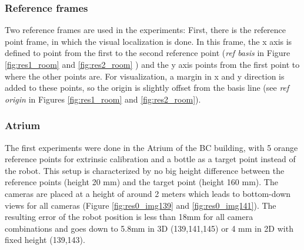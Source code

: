\subsubsection{Reference frames}
Two reference frames are used in the experiments: First, there is the reference point frame, in which the visual localization is done. 
In this frame, the x axis is defined to point from the first to the second reference point (\textit{ref basis} in Figure \ref{fig:res1_room} and \ref{fig:res2_room} ) and the y axis points from the first point to where the other points are.
For visualization, a margin in x and y direction is added to these points, so the origin is slightly offset from the basis line (see \textit{ref origin} in Figures \ref{fig:res1_room} and \ref{fig:res2_room}).

\subsubsection{Atrium}
The first experiments were done in the Atrium of the BC building, with 5 orange reference points for extrinsic calibration and a bottle as a target point instead of the robot.
This setup is characterized by no big height difference between the reference points (height 20 mm) and the target point (height 160 mm). 
The cameras are placed at a height of around 2 meters which leads to bottom-down views for all cameras (Figure \ref{fig:res0_img139} and \ref{fig:res0_img141}).
The resulting error of the robot position is less than 18mm for all camera combinations and goes down to 5.8mm in 3D (139,141,145) or 4 mm in 2D with fixed height (139,143). 
